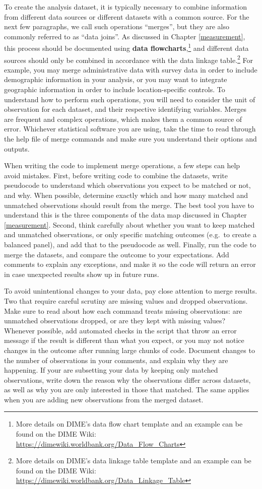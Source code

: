 \documentclass[
]{book}
\begin{document}
To create the analysis dataset,
it is typically necessary to combine information
from different data sources
or different datasets with a common source.
For the next few paragraphs,
we call such operations ``merges'',
but they are also commonly referred to as ``data joins''.
As discussed in Chapter \ref{measurement},
this process should be documented
using \textbf{data flowcharts},\footnote{More details on DIME's data flow chart template
  and an example can be found on the DIME Wiki:
  \url{https://dimewiki.worldbank.org/Data_Flow_Charts}}
and different data sources should only be combined
in accordance with the data linkage table.\footnote{More details on DIME's data linkage table template
  and an example can be found on the DIME Wiki:
  \url{https://dimewiki.worldbank.org/Data_Linkage_Table}}
For example, you may merge administrative data with survey data
in order to include demographic information in your analysis,
or you may want to integrate geographic information
in order to include location-specific controls.
To understand how to perform such operations,
you will need to consider the unit of observation for each dataset,
and their respective identifying variables.
Merges are frequent and complex operations,
which makes them a common source of error.
Whichever statistical software you are using,
take the time to read through the help file of merge commands
and make sure you understand their options and outputs.

When writing the code to implement merge operations,
a few steps can help avoid mistakes.
First, before writing code to combine the datasets,
write pseudocode to understand which observations you expect to be
matched or not, and why.
When possible, determine exactly which and how many
matched and unmatched observations should result from the merge.
The best tool you have to understand this is
the three components of the data map discussed in Chapter \ref{measurement}.
Second, think carefully about whether you want to keep matched and unmatched observations,
or only specific matching outcomes (e.g.~to create a balanced panel),
and add that to the pseudocode as well.
Finally, run the code to merge the datasets,
and compare the outcome to your expectations.
Add comments to explain any exceptions,
and make it so the code will return an error in case unexpected results show up in future runs.

To avoid unintentional changes to your data,
pay close attention to merge results.
Two that require careful scrutiny are missing values and dropped observations.
Make sure to read about how each command treats missing observations:
are unmatched observations dropped, or are they kept with missing values?
Whenever possible, add automated checks in the script that throw an error message
if the result is different than what you expect,
or you may not notice changes in the outcome after running large chunks of code.
Document changes to the number of observations in your comments,
and explain why they are happening.
If your are subsetting your data by keeping only matched observations,
write down the reason why the observations differ across datasets,
as well as why you are only interested in those that matched.
The same applies when you are adding new observations from the merged dataset.
\end{document}

